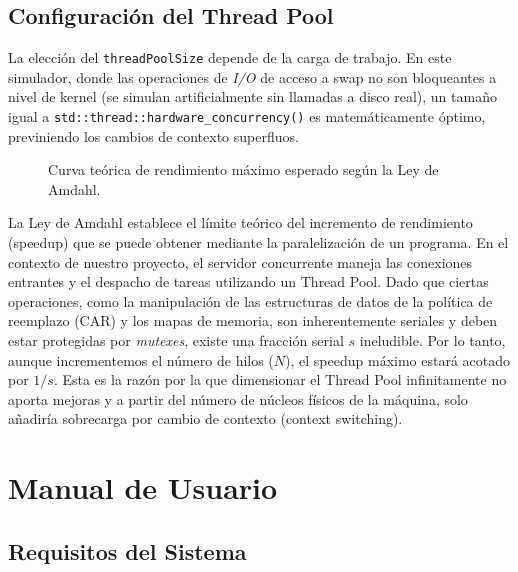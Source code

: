 \documentclass[12pt,letterpaper]{article}
\begin{document}
\subsection{Configuración del Thread Pool}

La elección del \texttt{threadPoolSize} depende de la carga de trabajo.
En este simulador, donde las operaciones de \textit{I/O} de acceso a swap no son bloqueantes a nivel de kernel (se simulan artificialmente sin llamadas a disco real), un tamaño igual a \texttt{std::thread::hardware\_concurrency()} es matemáticamente óptimo, previniendo los cambios de contexto superfluos.
\begin{figure}[H]
\centering
{}
\caption{Curva teórica de rendimiento máximo esperado según la Ley de Amdahl.}
\end{figure}

La Ley de Amdahl establece el límite teórico del incremento de rendimiento (speedup) que se puede obtener mediante la paralelización de un programa. En el contexto de nuestro proyecto, el servidor concurrente maneja las conexiones entrantes y el despacho de tareas utilizando un Thread Pool. Dado que ciertas operaciones, como la manipulación de las estructuras de datos de la política de reemplazo (CAR) y los mapas de memoria, son inherentemente seriales y deben estar protegidas por \textit{mutexes}, existe una fracción serial $s$ ineludible. Por lo tanto, aunque incrementemos el número de hilos ($N$), el speedup máximo estará acotado por $1/s$. Esta es la razón por la que dimensionar el Thread Pool infinitamente no aporta mejoras y a partir del número de núcleos físicos de la máquina, solo añadiría sobrecarga por cambio de contexto (context switching).

\newpage
\section{Manual de Usuario}

\subsection{Requisitos del Sistema}
\end{document}
